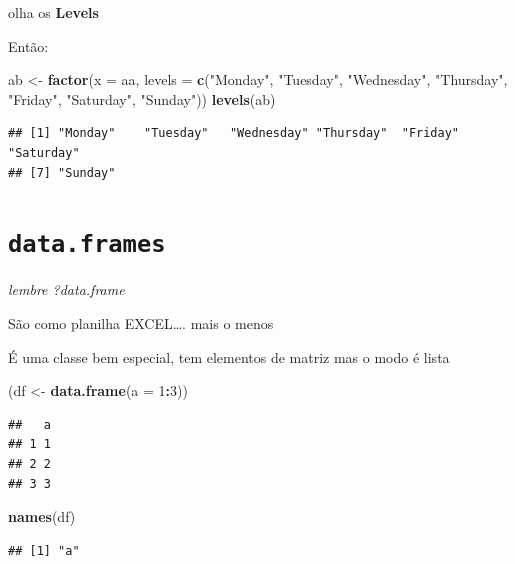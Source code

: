 \documentclass[]{book}
\newenvironment{Shaded}{\begin{snugshade}}{\end{snugshade}}
\newcommand{\KeywordTok}[1]{\textcolor[rgb]{0.13,0.29,0.53}{\textbf{#1}}}
\newcommand{\DataTypeTok}[1]{\textcolor[rgb]{0.13,0.29,0.53}{#1}}
\newcommand{\DecValTok}[1]{\textcolor[rgb]{0.00,0.00,0.81}{#1}}
\newcommand{\StringTok}[1]{\textcolor[rgb]{0.31,0.60,0.02}{#1}}
\newcommand{\OperatorTok}[1]{\textcolor[rgb]{0.81,0.36,0.00}{\textbf{#1}}}
\newcommand{\NormalTok}[1]{#1}
\begin{document}
olha os \textbf{Levels}

Então:

\begin{Shaded}
\begin{Highlighting}[]
\NormalTok{ab <-}\StringTok{ }\KeywordTok{factor}\NormalTok{(}\DataTypeTok{x =}\NormalTok{ aa,}
             \DataTypeTok{levels =} \KeywordTok{c}\NormalTok{(}\StringTok{"Monday"}\NormalTok{, }\StringTok{"Tuesday"}\NormalTok{,  }\StringTok{"Wednesday"}\NormalTok{,  }\StringTok{"Thursday"}\NormalTok{,}
                        \StringTok{"Friday"}\NormalTok{, }\StringTok{"Saturday"}\NormalTok{, }\StringTok{"Sunday"}\NormalTok{))}
\KeywordTok{levels}\NormalTok{(ab)}
\end{Highlighting}
\end{Shaded}

\begin{verbatim}
## [1] "Monday"    "Tuesday"   "Wednesday" "Thursday"  "Friday"    "Saturday" 
## [7] "Sunday"
\end{verbatim}

\section{\texorpdfstring{\texttt{data.frames}}{data.frames}}\label{data.frames}

\emph{lembre ?data.frame}

São como planilha EXCEL\ldots{}. mais o menos

É uma classe bem especial, tem elementos de matriz mas o modo é lista

\begin{Shaded}
\begin{Highlighting}[]
\NormalTok{(df <-}\StringTok{ }\KeywordTok{data.frame}\NormalTok{(}\DataTypeTok{a =} \DecValTok{1}\OperatorTok{:}\DecValTok{3}\NormalTok{))}
\end{Highlighting}
\end{Shaded}

\begin{verbatim}
##   a
## 1 1
## 2 2
## 3 3
\end{verbatim}

\begin{Shaded}
\begin{Highlighting}[]
\KeywordTok{names}\NormalTok{(df)}
\end{Highlighting}
\end{Shaded}

\begin{verbatim}
## [1] "a"
\end{verbatim}
\end{document}
